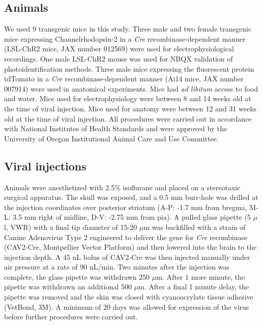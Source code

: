 \subsection{Animals}
%
We used 9 transgenic mice in this study. 
%
Three male and two female transgenic mice expressing Channelrhodopsin-2 in a \textit{Cre} recombinase-dependent manner (LSL-ChR2 mice, JAX number 012569) were used for electrophysiological recordings. 
%
One male LSL-ChR2 mouse was used for NBQX validation of photoidentification methods.
%
Three male mice expressing the fluorescent protein tdTomato in a \textit{Cre} recombinase-dependent manner (Ai14 mice, JAX number 007914) were used in anatomical experiments. 
%
Mice had \textit{ad libitum} access to food and water. Mice used for electrophysiology were between 8 and 14 weeks old at the time of viral injection. 
%
Mice used for anatomy were between 12 and 31 weeks old at the time of viral injection. 
%
All procedures were carried out in accordance with National Institutes of Health Standards and were approved by the University of Oregon Institutional Animal Care and Use Committee.


\subsection{Viral injections}
%
Animals were anesthetized with 2.5\% isoflurane and placed on a stereotaxic surgical apparatus. 
%
The skull was exposed, and a 0.5 mm burr-hole was drilled at the injection coordinates over posterior striatum (A-P: -1.7 mm from bregma, M-L: 3.5 mm right of midline, D-V: -2.75 mm from pia). 
%
A pulled glass pipette (5 $\mu$l, VWR) with a final tip diameter of 15-20 $\mu$m was backfilled with a strain of Canine Adenovirus Type 2 engineered to deliver the gene for \textit{Cre} recombinase (CAV2-Cre, Montpellier Vector Platform) and then lowered into the brain to the injection depth.
%
A 45 nL bolus of CAV2-Cre was then injected manually under air pressure at a rate of 90 nL/min.
%
Two minutes after the injection was complete, the glass pipette was withdrawn 250 $\mu$m.
%
After 1 more minute, the pipette was withdrawn an additional 500 $\mu$m. 
%
After a final 1 minute delay, the pipette was removed and the skin was closed with cyanoacrylate tissue adhesive (VetBond, 3M). 
%
A minimum of 20 days was allowed for expression of the virus before further procedures were carried out. 

